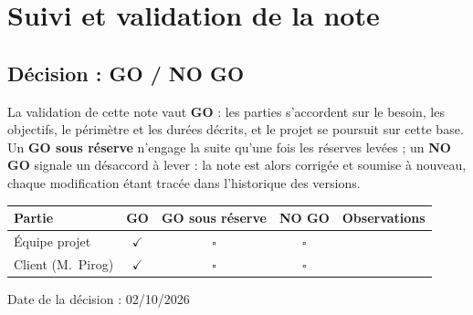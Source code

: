 \documentclass{report}
\begin{document}
\chapter{Suivi et validation de la note}

\section{Décision : GO / NO GO}

La validation de cette note vaut \textbf{GO} : les parties s'accordent sur le besoin, les objectifs, le périmètre et les durées décrits, et le projet se poursuit sur cette base. Un \textbf{GO sous réserve} n'engage la suite qu'une fois les réserves levées ; un \textbf{NO GO} signale un désaccord à lever : la note est alors corrigée et soumise à nouveau, chaque modification étant tracée dans l'historique des versions.

\begin{tabular}{|p{3.4cm}|c|c|c|p{4.4cm}|}
\hline
\textbf{Partie} & \textbf{GO} & \textbf{GO sous réserve} & \textbf{NO GO} & \textbf{Observations} \\ \hline
Équipe projet & $\checkmark$ & $\square$ & $\square$ & \rule{0pt}{0.9cm} \\ \hline
Client (M.~Pirog) & $\checkmark$ & $\square$ & $\square$ & \rule{0pt}{0.9cm} \\ \hline
\end{tabular}

\medskip

Date de la décision : 02/10/2026 {\hrulefill}
\end{document}
